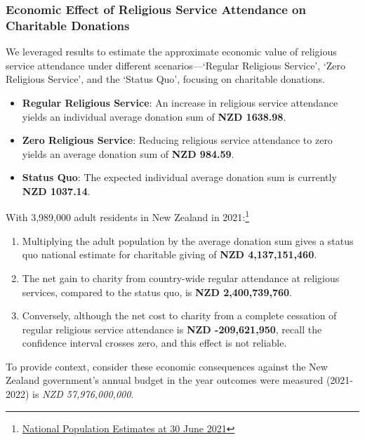 \documentclass[
  single column]{article}
\providecommand{\tightlist}{%
  \setlength{\itemsep}{0pt}\setlength{\parskip}{0pt}}\usepackage{longtable,booktabs,array}
\begin{document}
\subsubsection{Economic Effect of Religious Service Attendance on
Charitable
Donations}\label{economic-effect-of-religious-service-attendance-on-charitable-donations}

We leveraged results to estimate the approximate economic value of
religious service attendance under different scenarios---`Regular
Religious Service', `Zero Religious Service', and the `Status Quo',
focusing on charitable donations.

\begin{itemize}
\tightlist
\item
  \textbf{Regular Religious Service}: An increase in religious service
  attendance yields an individual average donation sum of \textbf{NZD
  1638.98}.
\item
  \textbf{Zero Religious Service}: Reducing religious service attendance
  to zero yields an average donation sum of \textbf{NZD 984.59}.
\item
  \textbf{Status Quo}: The expected individual average donation sum is
  currently \textbf{NZD 1037.14}.
\end{itemize}

With 3,989,000 adult residents in New Zealand in 2021:\footnote{\href{https://www.stats.govt.nz/information-releases/national-population-estimates-at-30-june-2021}{National
  Population Estimates at 30 June 2021}}

\begin{enumerate}
\def\labelenumi{\arabic{enumi}.}
\tightlist
\item
  Multiplying the adult population by the average donation sum gives a
  status quo national estimate for charitable giving of \textbf{NZD
  4,137,151,460}.
\item
  The net gain to charity from country-wide regular attendance at
  religious services, compared to the status quo, is \textbf{NZD
  2,400,739,760}.
\item
  Conversely, although the net cost to charity from a complete cessation
  of regular religious service attendance is \textbf{NZD -209,621,950},
  recall the confidence interval crosses zero, and this effect is not
  reliable.
\end{enumerate}

To provide context, consider these economic consequences against the New
Zealand government's annual budget in the year outcomes were measured
(2021-2022) is \emph{NZD 57,976,000,000}.
\end{document}

